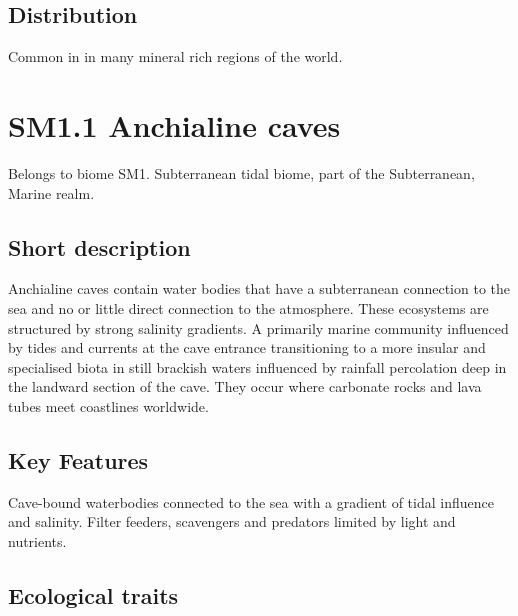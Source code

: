 \documentclass[
  letterpaper,
  DIV=11,
  numbers=noendperiod]{scrartcl}
\begin{document}
\subsection{Distribution}\label{distribution-65}

Common in in many mineral rich regions of the world.

\section{SM1.1 Anchialine caves}\label{sm1.1-anchialine-caves}

Belongs to biome SM1. Subterranean tidal biome, part of the
Subterranean, Marine realm.

\subsection{Short description}\label{short-description-66}

Anchialine caves contain water bodies that have a subterranean
connection to the sea and no or little direct connection to the
atmosphere. These ecosystems are structured by strong salinity
gradients. A primarily marine community influenced by tides and currents
at the cave entrance transitioning to a more insular and specialised
biota in still brackish waters influenced by rainfall percolation deep
in the landward section of the cave. They occur where carbonate rocks
and lava tubes meet coastlines worldwide.

\subsection{Key Features}\label{key-features-66}

Cave-bound waterbodies connected to the sea with a gradient of tidal
influence and salinity. Filter feeders, scavengers and predators limited
by light and nutrients.

\subsection{Ecological traits}\label{ecological-traits-66}
\end{document}
